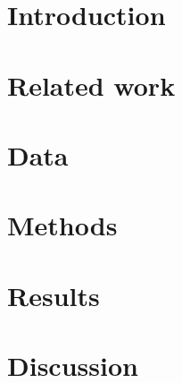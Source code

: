 \documentclass{article}
\title{}
\begin{document}
  \maketitle

  \section{Introduction}

  \section{Related work}

  \section{Data}

  \section{Methods}

  \section{Results}
  
  \section{Discussion}

  
\end{document}
